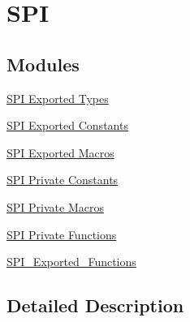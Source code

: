 \hypertarget{group___s_p_i}{}\section{S\+PI}
\label{group___s_p_i}
\subsection*{Modules}
\begin{DoxyCompactItemize}
\item 
\hyperlink{group___s_p_i___exported___types}{S\+P\+I Exported Types}
\item 
\hyperlink{group___s_p_i___exported___constants}{S\+P\+I Exported Constants}
\item 
\hyperlink{group___s_p_i___exported___macros}{S\+P\+I Exported Macros}
\item 
\hyperlink{group___s_p_i___private___constants}{S\+P\+I Private Constants}
\item 
\hyperlink{group___s_p_i___private___macros}{S\+P\+I Private Macros}
\item 
\hyperlink{group___s_p_i___private___functions}{S\+P\+I Private Functions}
\item 
\hyperlink{group___s_p_i___exported___functions}{S\+P\+I\+\_\+\+Exported\+\_\+\+Functions}
\end{DoxyCompactItemize}


\subsection{Detailed Description}
